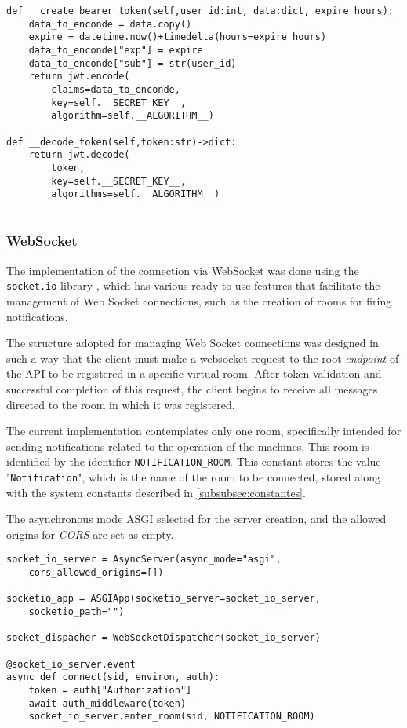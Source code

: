 \begin{verbatim}
def __create_bearer_token(self,user_id:int, data:dict, expire_hours):
    data_to_enconde = data.copy()
    expire = datetime.now()+timedelta(hours=expire_hours)
    data_to_enconde["exp"] = expire
    data_to_enconde["sub"] = str(user_id)
    return jwt.encode(
        claims=data_to_enconde,
        key=self.__SECRET_KEY__,
        algorithm=self.__ALGORITHM__)

def __decode_token(self,token:str)->dict:
    return jwt.decode(
        token,
        key=self.__SECRET_KEY__,
        algorithms=self.__ALGORITHM__)
    
\end{verbatim}

\subsubsection{WebSocket}\label{subsubsec:WebSocketImplement}
The implementation of the connection via WebSocket was done using the \texttt{socket.io} library \cite{socketIoDocs}, which has various ready-to-use features that facilitate the management of Web Socket connections, such as the creation of rooms for firing notifications.

The structure adopted for managing Web Socket connections was designed in such a way that the client must make a websocket request to the root \textit{endpoint} of the \gls{API} to be registered in a specific virtual room. After token validation and successful completion of this request, the client begins to receive all messages directed to the room in which it was registered.

The current implementation contemplates only one room, specifically intended for sending notifications related to the operation of the machines. This room is identified by the identifier \texttt{NOTIFICATION\_ROOM}. This constant stores the value "\texttt{Notification}", which is the name of the room to be connected, stored along with the system constants described in \ref{subsubsec:constantes}.

The asynchronous mode \gls{ASGI} selected for the server creation, and the allowed origins for \textit{CORS} are set as empty.

\begin{verbatim}
socket_io_server = AsyncServer(async_mode="asgi",
    cors_allowed_origins=[])

socketio_app = ASGIApp(socketio_server=socket_io_server,
    socketio_path="")

socket_dispacher = WebSocketDispatcher(socket_io_server)

@socket_io_server.event
async def connect(sid, environ, auth):
    token = auth["Authorization"]
    await auth_middleware(token)
    socket_io_server.enter_room(sid, NOTIFICATION_ROOM)
\end{verbatim}

